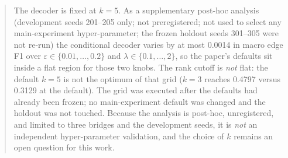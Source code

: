
\begin{quote}
The decoder is fixed at $k=5$. As a supplementary post-hoc analysis (development seeds 201--205 only; not preregistered; not used to select any main-experiment hyper-parameter; the frozen holdout seeds 301--305 were not re-run) the conditional decoder varies by at most 0.0014 in macro edge F1 over $\varepsilon\in\{0.01,\dots,0.2\}$ and $\lambda\in\{0.1,\dots,2\}$, so the paper's defaults sit inside a flat region for those two knobs. The rank cutoff is \emph{not} flat: the default $k=5$ is not the optimum of that grid ($k=3$ reaches 0.4797 versus 0.3129 at the default). The grid was executed after the defaults had already been frozen; no main-experiment default was changed and the holdout was not touched. Because the analysis is post-hoc, unregistered, and limited to three bridges and the development seeds, it is \emph{not} an independent hyper-parameter validation, and the choice of $k$ remains an open question for this work.
\end{quote}

